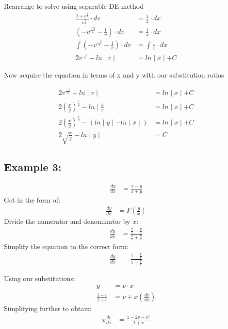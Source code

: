 \documentclass{article}
\begin{document}
\begin{flushleft}
{Rearrange to solve using separable DE method\\
\begin{align*}
\frac{1 + v^\frac{1}{2}}{-v^\frac{3}{2}} \cdot dv & = \frac{1}{x} \cdot dx \\
(-v^\frac{-3}{2} - \frac{1}{v}) \cdot dv & = \frac{1}{x} \cdot dx \\
\int (-v^\frac{-3}{2} - \frac{1}{v}) \cdot dv & = \int \frac{1}{x} \cdot dx  \\
2v^\frac{-1}{2} - ln \mid v \mid & = ln \mid x \mid + C 
\end{align*}

Now acquire the equation in terms of x and y with our substitution ratios

\begin{align*}
2v^\frac{-1}{2} - ln \mid v \mid & = ln \mid x \mid + C \\
2(\frac{x}{y})^\frac{1}{2} - ln \mid \frac{y}{x} \mid & = ln \mid x \mid + C \\
2(\frac{x}{y})^\frac{1}{2} - (ln \mid y \mid - ln \mid x \mid) & = ln \mid x \mid + C \\
2\sqrt{\frac{x}{y}} - ln \mid y \mid & = C 
\end{align*}
\bigskip
\subsection*{\textbf{Example 3:}}
\begin{align*}
\frac{dy}{dx} & = \frac{x-y}{x+y}
\end{align*}
Get in the form of:\\
\begin{align*}
\frac{dy}{dx} & = F (\frac{y}{x})
\end{align*}
Divide the numerator and denominator by $x$:\\
\begin{align*}
\frac{dy}{dx} & = \frac{\frac{x}{x}-\frac{y}{x}}{\frac{x}{x}+\frac{y}{x}}
\end{align*}
Simplify the equation to the correct form:
\begin{align*}
\frac{dy}{dx} & = \frac{1-\frac{y}{x}}{1+\frac{y}{x}}
\end{align*}

Using our substitutions:
\begin{align*}
y & = v \cdot  x\\
\frac{1-v}{1+v} & = v + x(\frac{dv}{dx})
 \end{align*}
 Simplifying further to obtain:
\begin{align*}
x \frac{dv}{dx} & = \frac{1-2v-v^2}{1+v}
 \end{align*} 
 
}
\end{flushleft}
\end{document}
